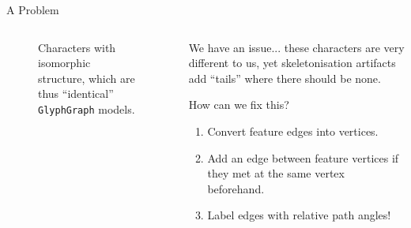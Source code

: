 \begin{frame}{A Problem}
\begin{columns}
\begin{column}{0.6\linewidth}
\begin{figure}
{
			}
			
			\vspace{0.5em}
			
			\caption{Characters with isomorphic structure, which are thus ``identical'' \texttt{GlyphGraph} models.\label{fig:badisomorphism}}
		\end{figure}
	\end{column}
	\begin{column}{0.4\linewidth}
		\vspace{0.5em}
		
		We have an issue... these characters are very different to us, yet skeletonisation artifacts add ``tails'' where there should be none.
		
		\pause
		
		\begin{alertblock}{How can we fix this?}
			\begin{enumerate}[<alert@+(1)>]
				\item Convert feature edges into vertices.
				\item Add an edge between feature vertices if they met at the same vertex beforehand.
				\item Label edges with relative path angles!
			\end{enumerate}
		\end{alertblock}
	\end{column}
\end{columns}
\end{frame}


